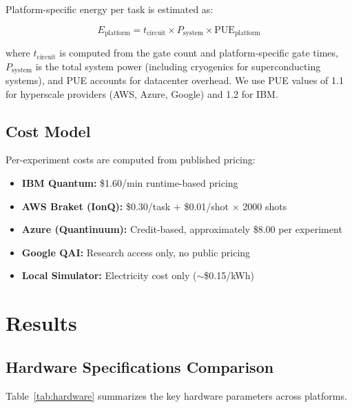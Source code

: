 \documentclass[conference]{IEEEtran}
\begin{document}
Platform-specific energy per task is estimated as:

\begin{equation}
E_{\text{platform}} = t_{\text{circuit}} \times P_{\text{system}} \times \text{PUE}_{\text{platform}}
\end{equation}

where $t_{\text{circuit}}$ is computed from the gate count and platform-specific gate times, $P_{\text{system}}$ is the total system power (including cryogenics for superconducting systems), and PUE accounts for datacenter overhead. We use PUE values of 1.1 for hyperscale providers (AWS, Azure, Google) and 1.2 for IBM.

\subsection{Cost Model}

Per-experiment costs are computed from published pricing:
\begin{itemize}
    \item \textbf{IBM Quantum:} \$1.60/min runtime-based pricing
    \item \textbf{AWS Braket (IonQ):} \$0.30/task + \$0.01/shot $\times$ 2000 shots
    \item \textbf{Azure (Quantinuum):} Credit-based, approximately \$8.00 per experiment
    \item \textbf{Google QAI:} Research access only, no public pricing
    \item \textbf{Local Simulator:} Electricity cost only ($\sim$\$0.15/kWh)
\end{itemize}

\section{Results}

\subsection{Hardware Specifications Comparison}

Table~\ref{tab:hardware} summarizes the key hardware parameters across platforms.
\end{document}

